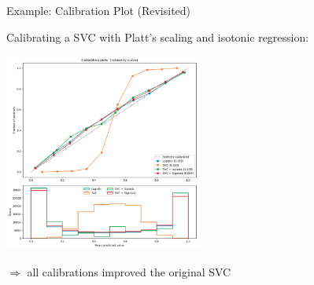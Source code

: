 \documentclass[11pt,compress,t,notes=noshow, xcolor=table]{beamer}
\begin{document}
    





\begin{frame}{Example: Calibration Plot (Revisited)}


Calibrating a SVC with Platt's scaling and isotonic regression:
\begin{center}
\includegraphics[width=0.5\textwidth]{figure_man/calibration2.png}
\end{center}
$\Rightarrow$ all calibrations improved the original SVC

\end{frame}
\end{document}
